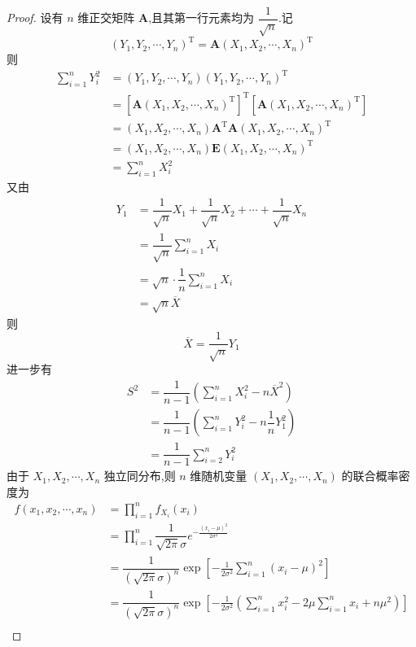\begin{proof}
    设有 $n$ 维正交矩阵 $\boldsymbol{A}$,且其第一行元素均为 $\dfrac{1}{\sqrt{n}}$.记
    $$
    (Y_1, Y_2, \cdots, Y_n)^{\text{T}} = \boldsymbol{A} (X_1, X_2, \cdots, X_n)^{\text{T}}
    $$
    则
    $$
    \begin{aligned}
        \sum_{i=1}^n Y_i^2 &= (Y_1, Y_2, \cdots, Y_n) (Y_1, Y_2, \cdots, Y_n)^{\text{T}} \\
        &= [\boldsymbol{A} (X_1, X_2, \cdots, X_n)^{\text{T}}]^{\text{T}} [\boldsymbol{A} (X_1, X_2, \cdots, X_n)^{\text{T}}] \\
        &= (X_1, X_2, \cdots, X_n) \boldsymbol{A}^{\text{T}} \boldsymbol{A} (X_1, X_2, \cdots, X_n)^{\text{T}} \\
        &= (X_1, X_2, \cdots, X_n) \boldsymbol{E} (X_1, X_2, \cdots, X_n)^{\text{T}} \\
        &= \sum_{i=1}^n X_i^2
    \end{aligned}
    $$
    又由
    $$
    \begin{aligned}
        Y_1 &= \dfrac{1}{\sqrt{n}} X_1 + \dfrac{1}{\sqrt{n}} X_2 + \cdots + \dfrac{1}{\sqrt{n}} X_n \\
        &= \dfrac{1}{\sqrt{n}} \sum_{i=1}^{n} X_i \\
        &= \sqrt{n} \cdot \dfrac{1}{n} \sum_{i=1}^{n} X_i \\
        &= \sqrt{n} \overline{X}
    \end{aligned}
    $$
    则
    $$
    \overline{X} = \dfrac{1}{\sqrt{n}} Y_1
    $$
    进一步有
    $$
    \begin{aligned}
        S^2 &= \dfrac{1}{n-1} \left( \sum_{i=1}^n X_i^2 - n \overline{X}^2 \right) \\
        &= \dfrac{1}{n-1} \left( \sum_{i=1}^n Y_i^2 - n \dfrac{1}{n} Y_1^2 \right) \\
        &= \dfrac{1}{n-1} \sum_{i=2}^n Y_i^2
    \end{aligned}
    $$
    由于 $X_1,X_2,\cdots,X_n$ 独立同分布,则 $n$ 维随机变量 $(X_1, X_2, \cdots, X_n)$ 的联合概率密度为
    $$
    \begin{aligned}
        f(x_1, x_2, \cdots, x_n) &= \prod_{i=1}^n f_{X_i}(x_i) \\
        &= \prod_{i=1}^n \dfrac{1}{\sqrt{2 \pi} \sigma} e^{-\frac{(x_i - \mu)^2}{2 \sigma^2}} \\
        &= \dfrac{1}{(\sqrt{2 \pi} \sigma)^n} \exp{ \left[-\frac{1}{2 \sigma^2} \sum_{i=1}^{n} (x_i - \mu)^2 \right] } \\
        &= \dfrac{1}{(\sqrt{2 \pi} \sigma)^n} \exp{ \left[-\frac{1}{2 \sigma^2} \left( \sum_{i=1}^{n} x_i^2 - 2 \mu \sum_{i=1}^{n} x_i + n \mu^2 \right) \right] } \\

\end{aligned}$$
\end{proof}
